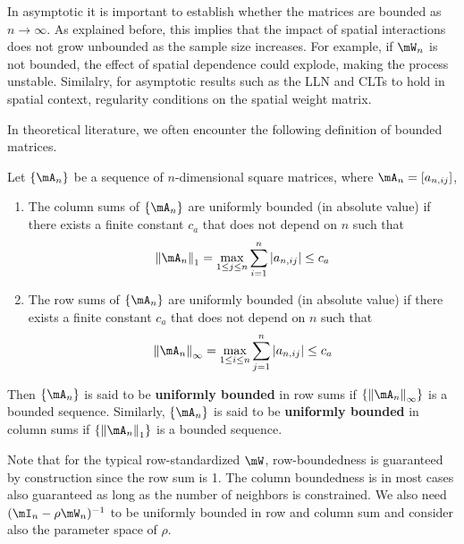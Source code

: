 \documentclass[english,12pt]{book}\usepackage[]{graphicx}\usepackage[]{xcolor}
\begin{document}
In asymptotic it is important to establish whether the matrices are bounded as $n \to \infty$. As explained before, this implies that the impact of spatial interactions does not grow unbounded as the sample size increases. For example, if $\mW_n$ is not bounded, the effect of spatial dependence could explode, making the process unstable. Similalry, for asymptotic results such as the LLN and CLTs to hold in spatial context, regularity conditions on the spatial weight matrix.

In theoretical literature, we often encounter the following definition of bounded matrices. 

\begin{definition}\label{def:Bounded_Matrices}
Let $\left\lbrace \mA_n \right\rbrace$ be a sequence of $n$-dimensional square matrices, where $\mA_n = \left[a_{n,ij}\right]$,
  \begin{enumerate}
    \item The column sums of $\left\lbrace \mA_n \right\rbrace$ are uniformly bounded (in absolute value) if there exists a finite constant $c_a$ that does not depend on $n$ such that 
    \begin{equation*}
      \left\|\mA_n\right\|_{1} = \max_{1 \leq j\leq n}\sum_{i = 1}^n\left|a_{n, ij}\right| \leq c_a
    \end{equation*}
     \item The row sums of $\left\lbrace \mA_n \right\rbrace$ are uniformly bounded (in absolute value) if there exists a finite constant $c_a$ that does not depend on $n$ such that 
    \begin{equation*}
      \left\|\mA_n\right\|_{\infty} = \max_{1 \leq i\leq n}\sum_{j = 1}^n\left|a_{n, ij}\right| \leq c_a
    \end{equation*}
  \end{enumerate}
\end{definition}

Then $\left\lbrace \mA_n \right\rbrace$ is said to be \textbf{uniformly bounded} in row sums if $\left\lbrace\left\|\mA_n\right\|_{\infty}\right\rbrace$ is a bounded sequence. Similarly, $\left\lbrace \mA_n \right\rbrace$ is said to be \textbf{uniformly bounded} in column sums if $\left\lbrace\left\|\mA_n\right\|_{1}\right\rbrace$ is a bounded sequence. 

Note that for the typical row-standardized $\mW$, row-boundedness is guaranteed by construction since the row sum is 1. The column boundedness is in most cases also guaranteed as long as the number of neighbors is constrained. We also need $(\mI_n - \rho\mW_n)^{-1}$ to be uniformly bounded in row and column sum and consider also the parameter space of $\rho$. 
\end{document}
